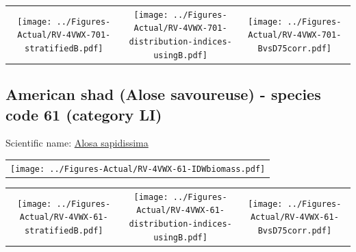 \documentclass[12pt]{article}\usepackage[]{graphicx}\usepackage[]{color}
\begin{document}
\vspace{1cm}
\begin{minipage}{1.0\textwidth}
 \begin{tabular}{ccc}
\texttt{[image: ../Figures-Actual/RV-4VWX-701-stratifiedB.pdf]} & 
\texttt{[image: ../Figures-Actual/RV-4VWX-701-distribution-indices-usingB.pdf]} & 
\texttt{[image: ../Figures-Actual/RV-4VWX-701-BvsD75corr.pdf]} \\ 
\end{tabular} 
\end{minipage}
\clearpage

\renewcommand\thefigure{\thesubsection\Alph{figure}}

\setcounter{figure}{0}

\hypertarget{sec:61}{%
\subsection{American shad (Alose savoureuse) - species code 61 (category LI)}\label{sec:61}}

  


Scientific name: \href{http://www.marinespecies.org/aphia.php?p=taxdetails\&id=158670}{Alosa sapidissima} \newline
\begin{minipage}{1.0\textwidth}
 \begin{tabular}{c}
\texttt{[image: ../Figures-Actual/RV-4VWX-61-IDWbiomass.pdf]} \\ 
\end{tabular} 
\end{minipage}
\newline

\vspace{1cm}
\begin{minipage}{1.0\textwidth}
 \begin{tabular}{ccc}
\texttt{[image: ../Figures-Actual/RV-4VWX-61-stratifiedB.pdf]} & 
\texttt{[image: ../Figures-Actual/RV-4VWX-61-distribution-indices-usingB.pdf]} & 
\texttt{[image: ../Figures-Actual/RV-4VWX-61-BvsD75corr.pdf]} \\ 
\end{tabular} 
\end{minipage}
\clearpage
\end{document}
